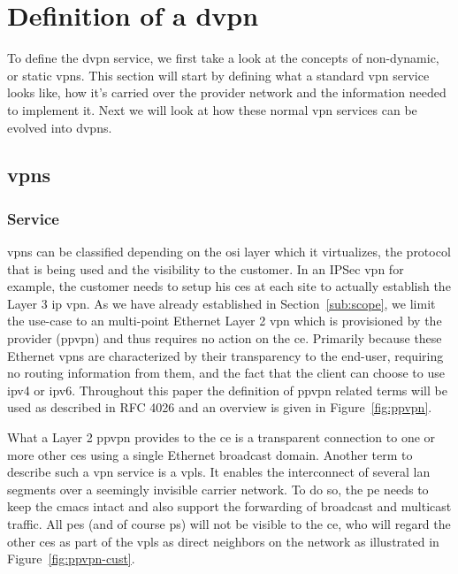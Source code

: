 \section{Definition of a \ac{dvpn}} %
\label{sec:dvpns}

To define the \ac{dvpn} service, we first take a look at the concepts of non-dynamic, or static \acp{vpn}. This section will start by defining what a standard \ac{vpn} service looks like, how it's carried over the provider network and the information needed to implement it. Next we will look at how these normal \ac{vpn} services can be evolved into \aclp{dvpn}.

\subsection{\acsp{vpn}} %
\label{sub:vpn}

\subsubsection{Service} %
\label{ssub:service}

\acp{vpn} can be classified depending on the \acs{osi} layer which it virtualizes, the protocol that is being used and the visibility to the customer. In an IPSec \ac{vpn} for example, the customer needs to setup his \acp{ce} at each site to actually establish the Layer 3 \acs{ip} \ac{vpn}. As we have already established in Section~\ref{sub:scope}, we limit the use-case to an multi-point Ethernet Layer 2 \ac{vpn} which is provisioned by the provider (\acs{ppvpn}) and thus requires no action on the \ac{ce}. Primarily because these Ethernet \acp{vpn} are characterized by their transparency to the end-user, requiring no routing information from them, and the fact that the client can choose to use \acs{ip}v4 or \acs{ip}v6. Throughout this paper the definition of \ac{ppvpn} related terms will be used as described in RFC 4026 \cite{vpn-terms} and an overview is given in Figure~\ref{fig:ppvpn}.

What a Layer 2 \ac{ppvpn} provides to the \ac{ce} is a transparent connection to one or more other \acp{ce} using a single Ethernet broadcast domain. Another term to describe such a \ac{vpn} service is a \ac{vpls}. It enables the interconnect of several \acs{lan} segments over a seemingly invisible carrier network. To do so, the \ac{pe} needs to keep the \acp{cmac} intact and also support the forwarding of broadcast and multicast traffic. All \acp{pe} (and of course \acp{p}) will not be visible to the \ac{ce}, who will regard the other \acp{ce} as part of the \ac{vpls} as direct neighbors on the network as illustrated in Figure~\ref{fig:ppvpn-cust}. 


